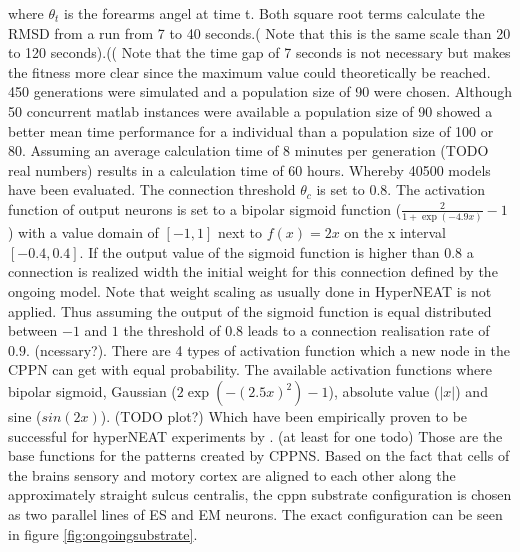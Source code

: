 where $\theta_t$ is the forearms angel at time t. Both square root terms calculate the RMSD from a run from 7 to 40 seconds.( Note that this is the same scale than 20 to 120 seconds).(( Note that the time gap of 7 seconds is not necessary but makes the fitness more clear since the maximum value could theoretically be reached. 
450 generations were simulated and a population size of 90 were chosen.
Although 50 concurrent matlab instances were available a population size of 90 showed a better mean time performance for a individual than a population size of 100 or 80. Assuming an average calculation time of 8 minutes per generation (TODO real numbers) results in a calculation time of 60 hours. Whereby 40500 models have been evaluated.
The connection threshold $\theta_c$ is set to 0.8. The activation function of output neurons is set to a bipolar sigmoid function ($\frac{2}{1+\exp(-4.9x)}-1$) with a value domain of $[-1,1]$ next to $f(x)=2x$ on the x interval $[-0.4,0.4]$. If the output value of the sigmoid function is higher than 0.8 a connection is realized width the initial weight for this connection defined by the ongoing model. Note that weight scaling as usually done in HyperNEAT is not applied. Thus assuming the output of the sigmoid function is equal distributed between $-1$ and $1$  the threshold of $0.8$ leads to a connection realisation rate of $0.9$. (ncessary?). 
There are 4 types of activation function which a new node in the CPPN can get with equal probability. The available activation functions where bipolar sigmoid, Gaussian ($2\exp(-(2.5x)^2)-1 $), absolute value ($|x|$) and sine ($sin(2x)$). (TODO plot?) Which have been empirically proven to be successful for hyperNEAT experiments by \cite{HyperNeatMultiagent}. (at least for one todo)
Those are the base functions for the patterns created by CPPNS.
Based on the fact that cells of the brains sensory and motory cortex are aligned to each other along the approximately straight sulcus centralis, the cppn substrate configuration is chosen as two parallel lines of ES and EM neurons. The exact configuration can be seen in figure \ref{fig:ongoingsubstrate}.

